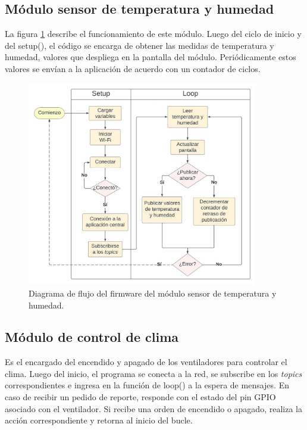 \pagebreak
\subsection{Módulo sensor de temperatura y humedad}
\label{Módulo sensor de temperatura y humedad}

La figura \ref{fig:flow_tempsensor} describe el funcionamiento de este módulo. Luego del ciclo de inicio y del setup(), el código se encarga de obtener las medidas de temperatura y humedad, valores que despliega en la pantalla del módulo. Periódicamente estos valores se envían a la aplicación de acuerdo con un contador de ciclos. 


\begin{figure}[!h]
	\centering
	\includegraphics[width=0.9\textwidth]{./Figures/chapter3/FirmwareTempSensor.jpg}
	\caption[Diagrama de flujo del firmware del módulo sensor de temperatura y humedad]{Diagrama de flujo del firmware del módulo sensor de temperatura y humedad.}
	\label{fig:flow_tempsensor}
\end{figure}

\pagebreak
\subsection{Módulo de control de clima}
\label{Módulo de control de clima}

Es el encargado del encendido y apagado de los ventiladores para controlar el clima.
Luego del inicio, el programa se conecta a la red, se subscribe en los \textit{topics} correspondientes e ingresa en la función de loop() a la espera de mensajes. En caso de recibir un pedido de reporte, responde con el estado del pin GPIO asociado con el ventilador. Si recibe una orden de encendido o apagado, realiza la acción correspondiente y retorna al inicio del bucle.

